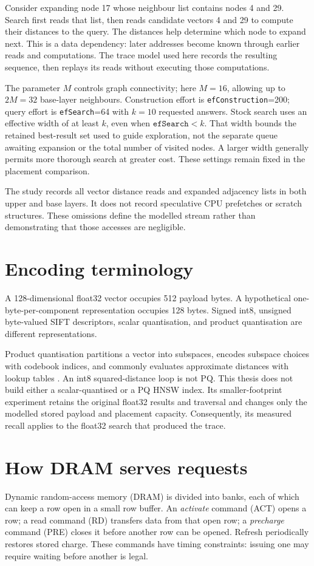 \documentclass[11pt,a4paper]{report}
\begin{document}
Consider expanding node 17 whose neighbour list contains nodes 4 and 29. Search first reads that list, then reads candidate vectors 4 and 29 to compute their distances to the query. The distances help determine which node to expand next. This is a data dependency: later addresses become known through earlier reads and computations. The trace model used here records the resulting sequence, then replays its reads without executing those computations.

The parameter $M$ controls graph connectivity; here $M=16$, allowing up to $2M=32$ base-layer neighbours. Construction effort is \texttt{efConstruction}=200; query effort is \texttt{efSearch}=64 with $k=10$ requested answers. Stock search uses an effective width of at least $k$, even when $\texttt{efSearch}<k$. That width bounds the retained best-result set used to guide exploration, not the separate queue awaiting expansion or the total number of visited nodes. A larger width generally permits more thorough search at greater cost. These settings remain fixed in the placement comparison.

The study records all vector distance reads and expanded adjacency lists in both upper and base layers. It does not record speculative CPU prefetches or scratch structures. These omissions define the modelled stream rather than demonstrating that those accesses are negligible.

\section{Encoding terminology}
A 128-dimensional float32 vector occupies 512 payload bytes. A hypothetical one-byte-per-component representation occupies 128 bytes. Signed int8, unsigned byte-valued SIFT descriptors, scalar quantisation, and product quantisation are different representations.

Product quantisation partitions a vector into subspaces, encodes subspace choices with codebook indices, and commonly evaluates approximate distances with lookup tables \cite{pq}. An int8 squared-distance loop is not PQ. This thesis does not build either a scalar-quantised or a PQ HNSW index. Its smaller-footprint experiment retains the original float32 results and traversal and changes only the modelled stored payload and placement capacity. Consequently, its measured recall applies to the float32 search that produced the trace.

\section{How DRAM serves requests}
Dynamic random-access memory (DRAM) is divided into banks, each of which can keep a row open in a small row buffer. An \emph{activate} command (ACT) opens a row; a read command (RD) transfers data from that open row; a \emph{precharge} command (PRE) closes it before another row can be opened. Refresh periodically restores stored charge. These commands have timing constraints: issuing one may require waiting before another is legal.
\end{document}
